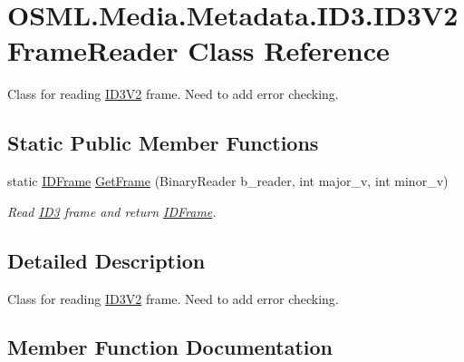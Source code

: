 \hypertarget{classOSML_1_1Media_1_1Metadata_1_1ID3_1_1ID3V2FrameReader}{}\section{O\+S\+M\+L.\+Media.\+Metadata.\+I\+D3.\+I\+D3\+V2\+Frame\+Reader Class Reference}
\label{classOSML_1_1Media_1_1Metadata_1_1ID3_1_1ID3V2FrameReader}


Class for reading \mbox{\hyperlink{classOSML_1_1Media_1_1Metadata_1_1ID3_1_1ID3V2}{I\+D3\+V2}} frame. Need to add error checking.  


\subsection*{Static Public Member Functions}
\begin{DoxyCompactItemize}
\item 
static \mbox{\hyperlink{classOSML_1_1Media_1_1Metadata_1_1ID3_1_1IDFrame}{I\+D\+Frame}} \mbox{\hyperlink{classOSML_1_1Media_1_1Metadata_1_1ID3_1_1ID3V2FrameReader_a3b1373f974795731aa8e23d6f3759cda}{Get\+Frame}} (Binary\+Reader b\+\_\+reader, int major\+\_\+v, int minor\+\_\+v)
\begin{DoxyCompactList}\small\item\em Read \mbox{\hyperlink{namespaceOSML_1_1Media_1_1Metadata_1_1ID3}{I\+D3}} frame and return \mbox{\hyperlink{classOSML_1_1Media_1_1Metadata_1_1ID3_1_1IDFrame}{I\+D\+Frame}}. \end{DoxyCompactList}\end{DoxyCompactItemize}


\subsection{Detailed Description}
Class for reading \mbox{\hyperlink{classOSML_1_1Media_1_1Metadata_1_1ID3_1_1ID3V2}{I\+D3\+V2}} frame. Need to add error checking. 



\subsection{Member Function Documentation}
\mbox{\label{classOSML_1_1Media_1_1Metadata_1_1ID3_1_1ID3V2FrameReader_a3b1373f974795731aa8e23d6f3759cda}} 
